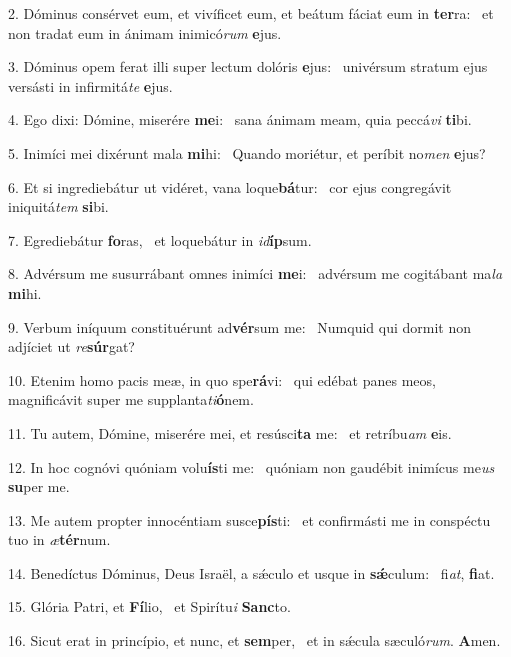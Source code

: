 2. Dóminus consérvet eum, et vivíficet eum, et beátum fáciat eum in \textbf{ter}ra: \ast\  et non tradat eum in ánimam inimicó\textit{rum} \textbf{e}jus.\

3. Dóminus opem ferat illi super lectum dolóris \textbf{e}jus: \ast\  univérsum stratum ejus versásti in infirmitá\textit{te} \textbf{e}jus.\

4. Ego dixi: Dómine, miserére \textbf{me}i: \ast\  sana ánimam meam, quia peccá\textit{vi} \textbf{ti}bi.\

5. Inimíci mei dixérunt mala \textbf{mi}hi: \ast\  Quando moriétur, et períbit no\textit{men} \textbf{e}jus?\

6. Et si ingrediebátur ut vidéret, vana loque\textbf{bá}tur: \ast\  cor ejus congregávit iniquitá\textit{tem} \textbf{si}bi.\

7. Egrediebátur \textbf{fo}ras, \ast\  et loquebátur in \textit{id}\textbf{íp}sum.\

8. Advérsum me susurrábant omnes inimíci \textbf{me}i: \ast\  advérsum me cogitábant ma\textit{la} \textbf{mi}hi.\

9. Verbum iníquum constituérunt ad\textbf{vér}sum me: \ast\  Numquid qui dormit non adjíciet ut \textit{re}\textbf{súr}gat?\

10. Etenim homo pacis meæ, in quo spe\textbf{rá}vi: \ast\  qui edébat panes meos, magnificávit super me supplanta\textit{ti}\textbf{ó}nem.\

11. Tu autem, Dómine, miserére mei, et resúsci\textbf{ta} me: \ast\  et retríbu\textit{am} \textbf{e}is.\

12. In hoc cognóvi quóniam volu\textbf{ís}ti me: \ast\  quóniam non gaudébit inimícus me\textit{us} \textbf{su}per me.\

13. Me autem propter innocéntiam susce\textbf{pís}ti: \ast\  et confirmásti me in conspéctu tuo in \textit{æ}\textbf{tér}num.\

14. Benedíctus Dóminus, Deus Israël, a sǽculo et usque in \textbf{sǽ}culum: \ast\  fi\textit{at}, \textbf{fi}at.\

15. Glória Patri, et \textbf{Fí}lio, \ast\  et Spirítu\textit{i} \textbf{Sanc}to.\

16. Sicut erat in princípio, et nunc, et \textbf{sem}per, \ast\  et in sǽcula sæculó\textit{rum}. \textbf{A}men.\

